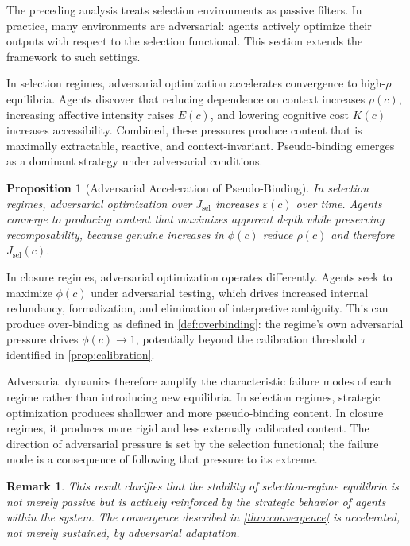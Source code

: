 \documentclass[12pt]{article}
\newtheorem{proposition}{Proposition}[section]
\newtheorem{remark}{Remark}[section]
\newcommand{\bind}{\phi}
\newcommand{\recomp}{\rho}
\newcommand{\Jsel}{J_{\mathrm{sel}}}
\begin{document}
The preceding analysis treats selection environments as passive filters.
In practice, many environments are adversarial: agents actively optimize
their outputs with respect to the selection functional. This section
extends the framework to such settings.

In selection regimes, adversarial optimization accelerates convergence
to high-$\recomp$ equilibria. Agents discover that reducing dependence
on context increases $\recomp(c)$, increasing affective intensity raises
$E(c)$, and lowering cognitive cost $K(c)$ increases accessibility.
Combined, these pressures produce content that is maximally extractable,
reactive, and context-invariant. Pseudo-binding emerges as a dominant
strategy under adversarial conditions.

\begin{proposition}[Adversarial Acceleration of Pseudo-Binding]
\label{prop:advpseudo}
In selection regimes, adversarial optimization over $\Jsel$ increases
$\varepsilon(c)$ over time. Agents converge to producing content that
maximizes apparent depth while preserving recomposability, because
genuine increases in $\bind(c)$ reduce $\recomp(c)$ and therefore
$\Jsel(c)$.
\end{proposition}

In closure regimes, adversarial optimization operates differently.
Agents seek to maximize $\bind(c)$ under adversarial testing, which
drives increased internal redundancy, formalization, and elimination of
interpretive ambiguity. This can produce over-binding as defined in
\cref{def:overbinding}: the regime's own adversarial pressure drives
$\bind(c) \to 1$, potentially beyond the calibration threshold $\tau$
identified in \cref{prop:calibration}.

Adversarial dynamics therefore amplify the characteristic failure modes
of each regime rather than introducing new equilibria. In selection
regimes, strategic optimization produces shallower and more
pseudo-binding content. In closure regimes, it produces more rigid and
less externally calibrated content. The direction of adversarial
pressure is set by the selection functional; the failure mode is a
consequence of following that pressure to its extreme.

\begin{remark}
This result clarifies that the stability of selection-regime equilibria
is not merely passive but is actively reinforced by the strategic
behavior of agents within the system. The convergence described in
\cref{thm:convergence} is accelerated, not merely sustained, by
adversarial adaptation.
\end{remark}
\end{document}
